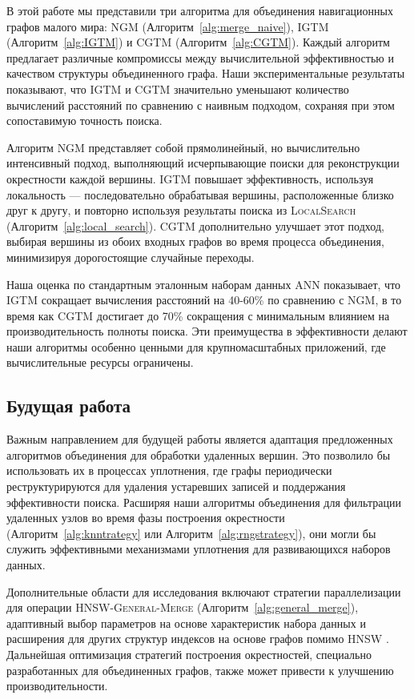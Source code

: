 \documentclass{article}
\begin{document}
В этой работе мы представили три алгоритма для объединения навигационных графов малого мира: \textsc{NGM} (Алгоритм~\ref{alg:merge_naive}), \textsc{IGTM} (Алгоритм~\ref{alg:IGTM}) и \textsc{CGTM} (Алгоритм~\ref{alg:CGTM}). Каждый алгоритм предлагает различные компромиссы между вычислительной эффективностью и качеством структуры объединенного графа. Наши экспериментальные результаты показывают, что \textsc{IGTM} и \textsc{CGTM} значительно уменьшают количество вычислений расстояний по сравнению с наивным подходом, сохраняя при этом сопоставимую точность поиска.

Алгоритм \textsc{NGM} представляет собой прямолинейный, но вычислительно интенсивный подход, выполняющий исчерпывающие поиски для реконструкции окрестности каждой вершины. \textsc{IGTM} повышает эффективность, используя локальность — последовательно обрабатывая вершины, расположенные близко друг к другу, и повторно используя результаты поиска из \textsc{LocalSearch} (Алгоритм~\ref{alg:local_search}). \textsc{CGTM} дополнительно улучшает этот подход, выбирая вершины из обоих входных графов во время процесса объединения, минимизируя дорогостоящие случайные переходы.

Наша оценка по стандартным эталонным наборам данных ANN показывает, что \textsc{IGTM} сокращает вычисления расстояний на 40-60\% по сравнению с \textsc{NGM}, в то время как \textsc{CGTM} достигает до 70\% сокращения с минимальным влиянием на производительность полноты поиска. Эти преимущества в эффективности делают наши алгоритмы особенно ценными для крупномасштабных приложений, где вычислительные ресурсы ограничены.

\subsection{Будущая работа}

Важным направлением для будущей работы является адаптация предложенных алгоритмов объединения для обработки удаленных вершин. Это позволило бы использовать их в процессах уплотнения, где графы периодически реструктурируются для удаления устаревших записей и поддержания эффективности поиска. Расширяя наши алгоритмы объединения для фильтрации удаленных узлов во время фазы построения окрестности (Алгоритм~\ref{alg:knntrategy} или Алгоритм~\ref{alg:rngstrategy}), они могли бы служить эффективными механизмами уплотнения для развивающихся наборов данных.

Дополнительные области для исследования включают стратегии параллелизации для операции \textsc{HNSW-General-Merge} (Алгоритм~\ref{alg:general_merge}), адаптивный выбор параметров на основе характеристик набора данных и расширения для других структур индексов на основе графов помимо HNSW \cite{hnsw}. Дальнейшая оптимизация стратегий построения окрестностей, специально разработанных для объединенных графов, также может привести к улучшению производительности.



\end{document}
